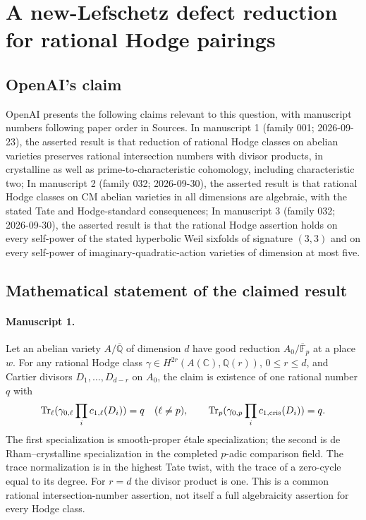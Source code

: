 \documentclass[11pt]{article}
\begin{document}
\section*{A new-Lefschetz defect reduction for rational Hodge pairings}

\subsection{OpenAI's claim}
OpenAI presents the following claims relevant to this question, with manuscript numbers following paper order in Sources. In manuscript 1 (family 001; 2026-09-23), the asserted result is that reduction of rational Hodge classes on abelian varieties preserves rational intersection numbers with divisor products, in crystalline as well as prime-to-characteristic cohomology, including characteristic two; In manuscript 2 (family 032; 2026-09-30), the asserted result is that rational Hodge classes on CM abelian varieties in all dimensions are algebraic, with the stated Tate and Hodge-standard consequences; In manuscript 3 (family 032; 2026-09-30), the asserted result is that the rational Hodge assertion holds on every self-power of the stated hyperbolic Weil sixfolds of signature $(3,3)$ and on every self-power of imaginary-quadratic-action varieties of dimension at most five.

\subsection{Mathematical statement of the claimed result}
\paragraph{Manuscript 1.}
Let an abelian variety $A/\overline{\mathbb Q}$ of dimension $d$ have good reduction $A_0/\overline{\mathbb F}_p$ at a place $w$. For any rational Hodge class $\gamma\in H^{2r}(A(\mathbb C),\mathbb Q(r))$, $0\le r\le d$, and Cartier divisors $D_1,\ldots,D_{d-r}$ on $A_0$, the claim is existence of one rational number $q$ with
\[
 \operatorname{Tr}_{\ell}(\gamma_{0,\ell}\prod_i c_{1,\ell}(D_i))=q\quad(\ell\ne p),\qquad
 \operatorname{Tr}_p(\gamma_{0,p}\prod_i c_{1,\rm cris}(D_i))=q.
\]
The first specialization is smooth-proper \'etale specialization; the second is de Rham--crystalline specialization in the completed $p$-adic comparison field. The trace normalization is in the highest Tate twist, with the trace of a zero-cycle equal to its degree. For $r=d$ the divisor product is one. This is a common rational intersection-number assertion, not itself a full algebraicity assertion for every Hodge class.
\end{document}
